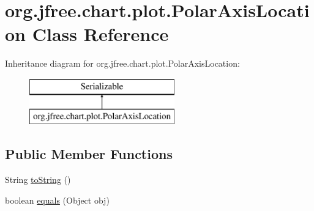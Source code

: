 \hypertarget{classorg_1_1jfree_1_1chart_1_1plot_1_1_polar_axis_location}{}\section{org.\+jfree.\+chart.\+plot.\+Polar\+Axis\+Location Class Reference}
\label{classorg_1_1jfree_1_1chart_1_1plot_1_1_polar_axis_location}
Inheritance diagram for org.\+jfree.\+chart.\+plot.\+Polar\+Axis\+Location\+:\begin{figure}[H]
\begin{center}
\leavevmode
\includegraphics[height=2.000000cm]{classorg_1_1jfree_1_1chart_1_1plot_1_1_polar_axis_location}
\end{center}
\end{figure}
\subsection*{Public Member Functions}
\begin{DoxyCompactItemize}
\item 
String \mbox{\hyperlink{classorg_1_1jfree_1_1chart_1_1plot_1_1_polar_axis_location_a8ec9f6f533817ad9c8d4fbf3e0f5dd7a}{to\+String}} ()
\item 
boolean \mbox{\hyperlink{classorg_1_1jfree_1_1chart_1_1plot_1_1_polar_axis_location_a00715aadd4779d2a536040938cbd1154}{equals}} (Object obj)
\end{DoxyCompactItemize}
